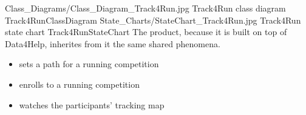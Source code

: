\documentclass[../../rasd.tex]{subfiles}
\begin{document}
			\image {13cm} {Class_Diagrams/Class_Diagram_Track4Run.jpg} {Track4Run class diagram} {Track4RunClassDiagram}
			\image {13cm} {State_Charts/StateChart_Track4Run.jpg} {Track4Run state chart} {Track4RunStateChart}
			The product, because it is built on top of Data4Help, inherites from it the same shared phenomena.

			\begin{itemize}
				\item {} sets a path for a running competition
				\item {} enrolls to a running competition
				\item {} watches the participants' tracking map			
			\end{itemize}
\end{document}
